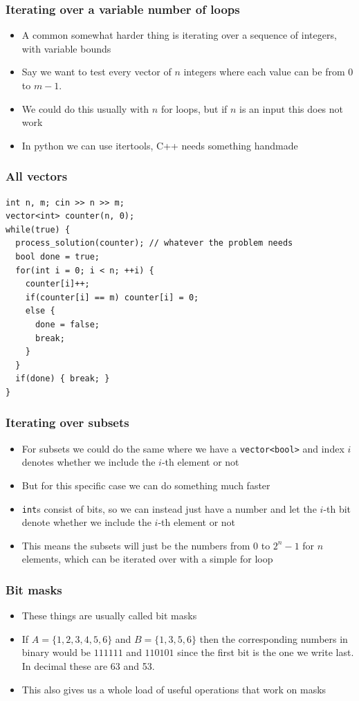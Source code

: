 \documentclass{beamer}
\begin{document}
\begin{frame}[plain]
	\frametitle{Iterating over a variable number of loops}
	\begin{itemize}
		 \item A common somewhat harder thing is iterating over a sequence of integers, with variable bounds
		 \item Say we want to test every vector of $n$ integers where each value can be from $0$ to $m - 1$.
		 \item We could do this usually with $n$ for loops, but if $n$ is an input this does not work
		 \item In python we can use itertools, C++ needs something handmade
	\end{itemize}
\end{frame}

\begin{frame}
	\frametitle{All vectors}
	\begin{verbatim}
int n, m; cin >> n >> m;
vector<int> counter(n, 0);
while(true) {
  process_solution(counter); // whatever the problem needs
  bool done = true;
  for(int i = 0; i < n; ++i) {
    counter[i]++;
    if(counter[i] == m) counter[i] = 0;
    else {
      done = false;
      break;
    }
  }
  if(done) { break; }
}
	\end{verbatim}
\end{frame}

\begin{frame}[plain]
	\frametitle{Iterating over subsets}
	\begin{itemize}
		 \item For subsets we could do the same where we have a \texttt{vector<bool>} and index $i$ denotes whether we include the $i$-th element or not
		 \item But for this specific case we can do something much faster
		 \item \texttt{int}s consist of bits, so we can instead just have a number and let the $i$-th bit denote whether we include the $i$-th element or not
		 \item This means the subsets will just be the numbers from $0$ to $2^n - 1$ for $n$ elements, which can be iterated over with a simple for loop
	\end{itemize}
\end{frame}

\begin{frame}[plain]
	\frametitle{Bit masks}
	\begin{itemize}
		 \item These things are usually called bit masks
		 \item If $A = \{1, 2, 3, 4, 5, 6\}$ and $B = \{1, 3, 5, 6\}$ then the corresponding numbers in binary would be $111111$ and $110101$ since the first bit is the one we write last. In decimal these are 63 and 53.
		 \item This also gives us a whole load of useful operations that work on masks
	\end{itemize}
\end{frame}
\end{document}
